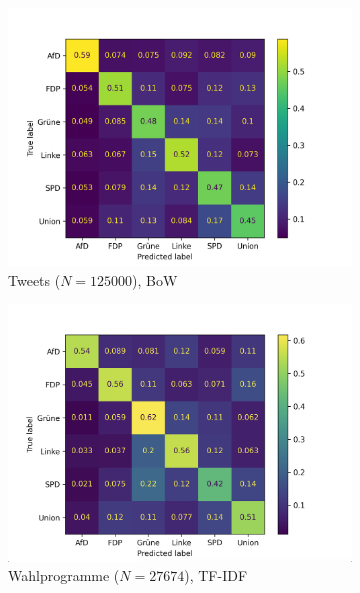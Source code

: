 \begin{figure}[H]
\centering
\begin{subfigure}{0.49\textwidth}
    \includegraphics[width=\textwidth]{data/images/modeling/mlp/tweets_confusion_matrix.png}
    \caption{Tweets (\(N=\num{125000}\)), \ac{BoW}}
    \label{sfig:confusionMatrixMlpTweets}
\end{subfigure}
\hfill
\begin{subfigure}{0.49\textwidth}
    \includegraphics[width=\textwidth]{data/images/modeling/mlp/party_programs_confusion_matrix.png}
    \caption{Wahlprogramme (\(N=\num{27674}\)), \ac{TF-IDF}}
    \label{sfig:confusionMatrixMlpManifest}
\end{subfigure}
\hfill
\begin{subfigure}{0.49\textwidth}

\end{subfigure}
\end{figure}
